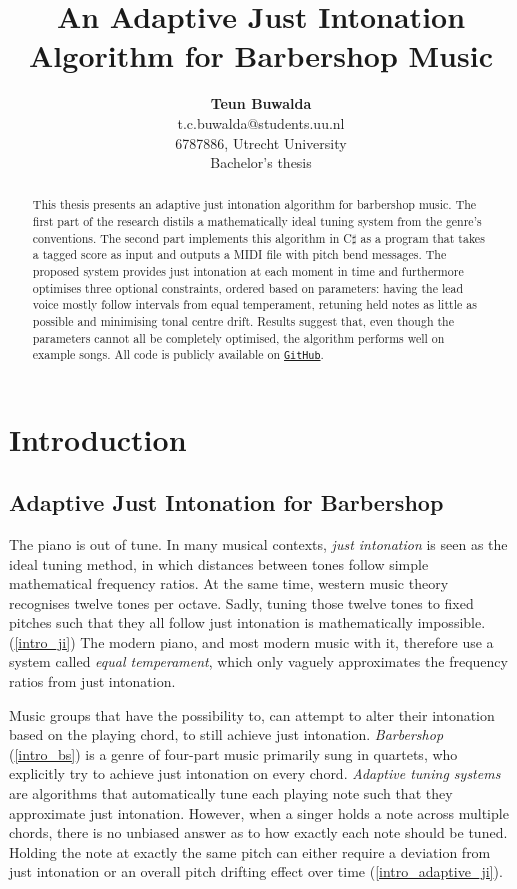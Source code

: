 \documentclass[a4paper]{article}
\title{An Adaptive Just Intonation Algorithm for Barbershop Music}
\author{{\bf Teun Buwalda}\\t.c.buwalda@students.uu.nl\\6787886, Utrecht University\\Bachelor's thesis}
\begin{document}
\maketitle


\begin{abstract}
	This thesis presents an adaptive just intonation algorithm for barbershop music. The first part of the research distils a mathematically ideal tuning system from the genre's conventions. The second part implements this algorithm in C$\sharp$ as a program that takes a tagged score as input and outputs a MIDI file with pitch bend messages. The proposed system provides just intonation at each moment in time and furthermore optimises three optional constraints, ordered based on parameters: having the lead voice mostly follow intervals from equal temperament, retuning held notes as little as possible and minimising tonal centre drift. Results suggest that, even though the parameters cannot all be completely optimised, the algorithm performs well on example songs. All code is publicly available on \texttt{\href{https://GitHub.com/teuncb/AdaptiveBarbershop}{GitHub}}.
\end{abstract}

\section{Introduction}
\subsection{Adaptive Just Intonation for Barbershop}
The piano is out of tune. In many musical contexts, \textit{just intonation} is seen as the ideal tuning method, in which distances between tones follow simple mathematical frequency ratios. \cite{boyden_prelleur_1951, fonville_ben_1991} At the same time, western music theory recognises twelve tones per octave. \cite{persichetti_twentieth-century_1961} Sadly, tuning those twelve tones to fixed pitches such that they all follow just intonation is mathematically impossible. (\ref{intro_ji}) The modern piano, and most modern music with it, therefore use a system called \textit{equal temperament}, which only vaguely approximates the frequency ratios from just intonation. \cite{van_de_craats_fis_1989}

Music groups that have the possibility to, can attempt to alter their intonation based on the playing chord, to still achieve just intonation. \textit{Barbershop} (\ref{intro_bs}) is a genre of four-part music primarily sung in quartets, who explicitly try to achieve just intonation on every chord. \cite{barbershop_harmony_society_contest_2022, averill_bell_1999} \textit{Adaptive tuning systems} are algorithms that automatically tune each playing note such that they approximate just intonation. \cite{sethares_adaptive_1994} However, when a singer holds a note across multiple chords, there is no unbiased answer as to how exactly each note should be tuned. Holding the note at exactly the same pitch can either require a deviation from just intonation or an overall pitch drifting effect over time (\ref{intro_adaptive_ji}).
\end{document}
